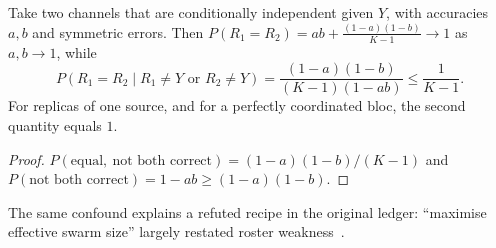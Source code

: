 \begin{proposition}\label{prop:clones}
Take two channels that are conditionally independent given $Y$, with accuracies $a,b$ and symmetric errors. Then $P(R_1{=}R_2)=ab+\frac{(1-a)(1-b)}{K-1}\to1$ as $a,b\to1$, while
\[
P(R_1{=}R_2\mid R_1{\neq}Y\text{ or }R_2{\neq}Y)=\frac{(1-a)(1-b)}{(K-1)(1-ab)}\le\frac1{K-1}.
\]
For replicas of one source, and for a perfectly coordinated bloc, the second quantity equals $1$.
\end{proposition}
\begin{proof}
$P(\text{equal},\ \text{not both correct})=(1-a)(1-b)/(K-1)$ and $P(\text{not both correct})=1-ab\ge(1-a)(1-b)$.
\end{proof}
The same confound explains a refuted recipe in the original ledger: ``maximise effective swarm size'' largely restated roster weakness~\citep{das2026aip}.
